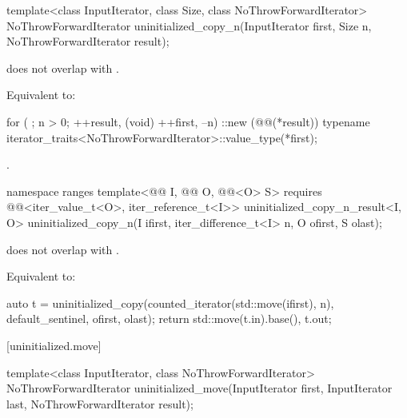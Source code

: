 %
\begin{itemdecl}
template<class InputIterator, class Size, class NoThrowForwardIterator>
  NoThrowForwardIterator uninitialized_copy_n(InputIterator first, Size n,
                                              NoThrowForwardIterator result);
\end{itemdecl}

\begin{itemdescr}
\pnum
\expects
{} does not overlap with .

\pnum
\effects
Equivalent to:
\begin{codeblock}
for ( ; n > 0; ++result, (void) ++first, --n)
  ::new (@@(*result))
    typename iterator_traits<NoThrowForwardIterator>::value_type(*first);
\end{codeblock}

\pnum
\returns
{}.
\end{itemdescr}

%
\begin{itemdecl}
namespace ranges {
  template<@@ I, @@ O, @@<O> S>
    requires @@<iter_value_t<O>, iter_reference_t<I>>
    uninitialized_copy_n_result<I, O>
      uninitialized_copy_n(I ifirst, iter_difference_t<I> n, O ofirst, S olast);
}
\end{itemdecl}

\begin{itemdescr}
\pnum
\expects
{} does not overlap with
.

\pnum
\effects
Equivalent to:
\begin{codeblock}
auto t = uninitialized_copy(counted_iterator(std::move(ifirst), n),
                            default_sentinel, ofirst, olast);
return {std::move(t.in).base(), t.out};
\end{codeblock}
\end{itemdescr}

[uninitialized.move]{}

%
\begin{itemdecl}
template<class InputIterator, class NoThrowForwardIterator>
  NoThrowForwardIterator uninitialized_move(InputIterator first, InputIterator last,
                                            NoThrowForwardIterator result);
\end{itemdecl}

